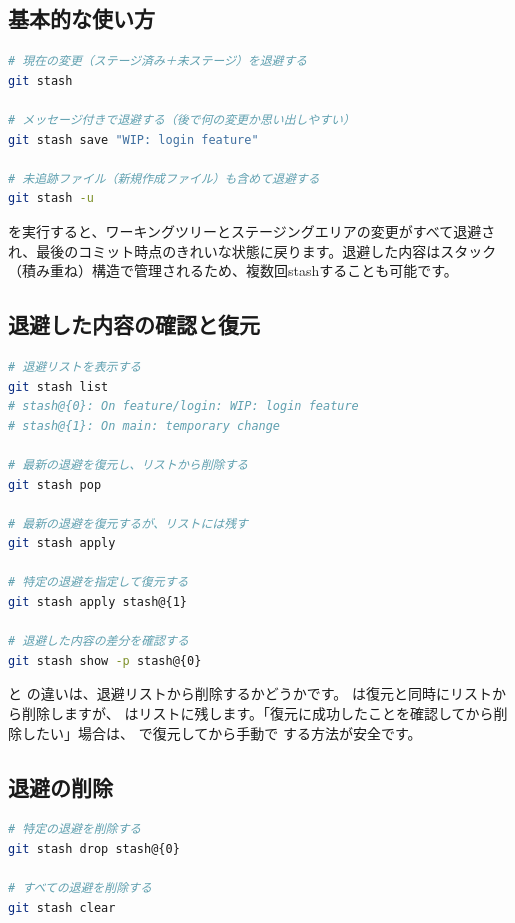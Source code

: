\subsection{基本的な使い方}

\begin{lstlisting}[language=bash]
# 現在の変更（ステージ済み＋未ステージ）を退避する
git stash

# メッセージ付きで退避する（後で何の変更か思い出しやすい）
git stash save "WIP: login feature"

# 未追跡ファイル（新規作成ファイル）も含めて退避する
git stash -u
\end{lstlisting}

 を実行すると、ワーキングツリーとステージングエリアの変更がすべて退避され、最後のコミット時点のきれいな状態に戻ります。退避した内容はスタック（積み重ね）構造で管理されるため、複数回stashすることも可能です。

\subsection{退避した内容の確認と復元}

\begin{lstlisting}[language=bash]
# 退避リストを表示する
git stash list
# stash@{0}: On feature/login: WIP: login feature
# stash@{1}: On main: temporary change

# 最新の退避を復元し、リストから削除する
git stash pop

# 最新の退避を復元するが、リストには残す
git stash apply

# 特定の退避を指定して復元する
git stash apply stash@{1}

# 退避した内容の差分を確認する
git stash show -p stash@{0}
\end{lstlisting}

 と  の違いは、退避リストから削除するかどうかです。 は復元と同時にリストから削除しますが、 はリストに残します。「復元に成功したことを確認してから削除したい」場合は、 で復元してから手動で  する方法が安全です。

\subsection{退避の削除}

\begin{lstlisting}[language=bash]
# 特定の退避を削除する
git stash drop stash@{0}

# すべての退避を削除する
git stash clear
\end{lstlisting}

